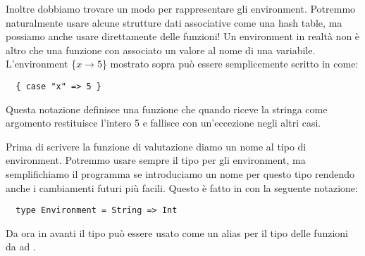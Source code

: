 Inoltre dobbiamo trovare un modo per rappresentare gli environment. Potremmo naturalmente usare alcune strutture dati associative come una hash table, ma possiamo anche usare direttamente delle funzioni! Un environment in realt\`a   non \`e altro che una funzione con associato un valore al nome di una variabile. L'environment \{$x\rightarrow 5$\} mostrato sopra pu\`o essere semplicemente scritto in \Scala come:
\begin{lstlisting}
  { case "x" => 5 }
\end{lstlisting}
Questa notazione definisce una funzione che quando riceve la stringa  come argomento restituisce l'intero 5 e fallisce con un'eccezione negli altri casi.

Prima di scrivere la funzione di valutazione diamo un nome al tipo di environment. Potremmo usare sempre il tipo  per gli environment, ma semplifichiamo il programma se introduciamo un nome per questo tipo rendendo anche i cambiamenti futuri pi\`u facili. Questo \`e fatto in \Scala con la seguente notazione:
\begin{lstlisting}
  type Environment = String => Int
\end{lstlisting}
Da ora in avanti il tipo  pu\`o essere usato come un alias per il tipo delle funzioni da  ad .


